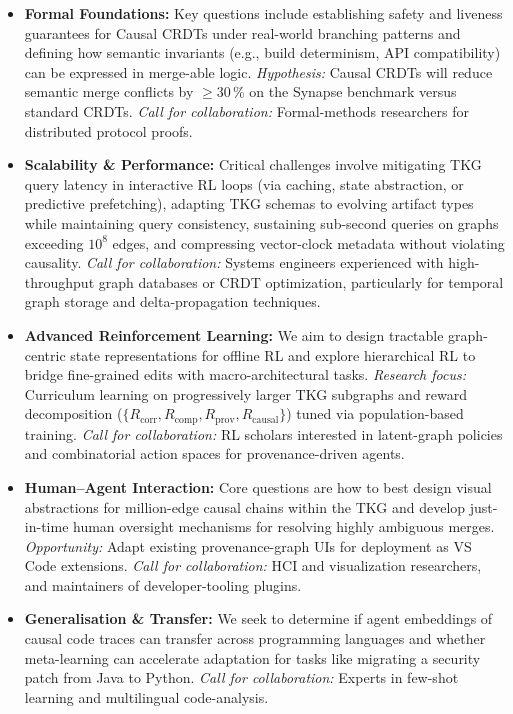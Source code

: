 \documentclass{article}
\begin{document}
\begin{itemize}
  \item \textbf{Formal Foundations:} Key questions include establishing safety and liveness guarantees for Causal CRDTs under real-world branching patterns and defining how semantic invariants (e.g., build determinism, API compatibility) can be expressed in merge-able logic. \emph{Hypothesis:} Causal CRDTs will reduce semantic merge conflicts by $\ge$30\,\% on the Synapse benchmark versus standard CRDTs. \emph{Call for collaboration:} Formal-methods researchers for distributed protocol proofs.

  \item \textbf{Scalability \& Performance:} Critical challenges involve mitigating TKG query latency in interactive RL loops (via caching, state abstraction, or predictive prefetching), adapting TKG schemas to evolving artifact types while maintaining query consistency, sustaining sub-second queries on graphs exceeding $10^{8}$ edges, and compressing vector-clock metadata without violating causality. \emph{Call for collaboration:} Systems engineers experienced with high-throughput graph databases or CRDT optimization, particularly for temporal graph storage and delta-propagation techniques.

  \item \textbf{Advanced Reinforcement Learning:} We aim to design tractable graph-centric state representations for offline RL and explore hierarchical RL to bridge fine-grained edits with macro-architectural tasks. \emph{Research focus:} Curriculum learning on progressively larger TKG subgraphs and reward decomposition ($\{R_{\text{corr}},R_{\text{comp}},R_{\text{prov}},R_{\text{causal}}\}$) tuned via population-based training. \emph{Call for collaboration:} RL scholars interested in latent-graph policies and combinatorial action spaces for provenance-driven agents.

  \item \textbf{Human–Agent Interaction:} Core questions are how to best design visual abstractions for million-edge causal chains within the TKG and develop just-in-time human oversight mechanisms for resolving highly ambiguous merges. \emph{Opportunity:} Adapt existing provenance-graph UIs \cite{ref15, ref16} for deployment as VS Code extensions. \emph{Call for collaboration:} HCI and visualization researchers, and maintainers of developer-tooling plugins.

  \item \textbf{Generalisation \& Transfer:} We seek to determine if agent embeddings of causal code traces can transfer across programming languages and whether meta-learning can accelerate adaptation for tasks like migrating a security patch from Java to Python. \emph{Call for collaboration:} Experts in few-shot learning and multilingual code-analysis.


\end{itemize}
\end{document}
